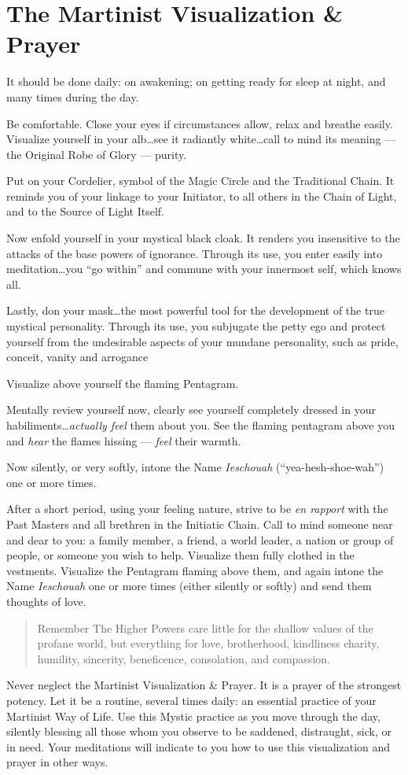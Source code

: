 \chapter{The Martinist Visualization \& Prayer}
It should be done daily: on awakening; on getting ready for sleep at night, and many
times during the day.

Be comfortable. Close your eyes if circumstances allow, relax and breathe easily. Visualize yourself in your alb\ldots see it radiantly white\ldots call to mind its meaning --- the Original Robe of Glory --- purity.

Put on your Cordelier, symbol of the Magic Circle and the Traditional Chain. It reminds you of your linkage to your Initiator, to all others in the Chain of Light, and to the Source of Light Itself.

Now enfold yourself in your mystical black cloak. It renders you insensitive to the attacks of the base powers of ignorance. Through its use, you enter easily into meditation\ldots you ``go within'' and commune with your innermost self, which knows all.

Lastly, don your mask\ldots the most powerful tool for the development of the true mystical personality. Through its use, you subjugate the petty ego and protect yourself from the undesirable aspects of your mundane personality, such as pride, conceit, vanity and arrogance

Visualize above yourself the flaming Pentagram.

Mentally review yourself now, clearly see yourself completely dressed in your habiliments\ldots \textit{actually feel} them about you. See the flaming pentagram above you and \textit{hear} the flames hissing --- \textit{feel} their warmth.

Now silently, or very softly, intone the Name \textit{Ieschouah} (``yea-hesh-shoe-wah'') one or more times.

After a short period, using your feeling nature, strive to be \textit{en rapport} with the Past Masters and all brethren in the Initiatic Chain. Call to mind someone near and dear to you: a family member, a friend, a world leader, a nation or group of people, or someone you wish to help. Visualize them fully clothed in the vestments. Visualize the Pentagram flaming above them, and again intone the Name \textit{Ieschouah} one or more times (either silently or softly) and send them thoughts of love.

\begin{quote}{Remember}
The Higher Powers care little for the shallow values of the profane world, but everything for love, brotherhood, kindliness charity, humility, sincerity, beneficence, consolation, and compassion.
\end{quote}

Never neglect the Martinist Visualization \& Prayer. It is a prayer of the strongest potency. Let it be a routine, several times daily: an essential practice of your Martinist Way of Life. Use this Mystic practice as you move through the day, silently blessing all those whom you observe to be saddened, distraught, sick, or in need. Your meditations will indicate to you how to use this visualization and prayer in other ways.